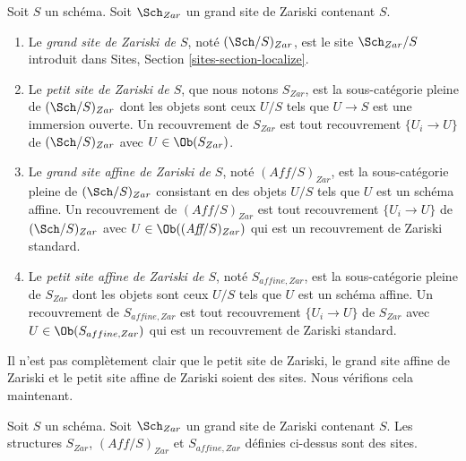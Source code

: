 \begin{definition}
\label{definition-big-small-Zariski}
Soit $S$ un schéma. Soit $\Sch_{Zar}$ un grand site de Zariski contenant $S$.
\begin{enumerate}
\item Le {\it grand site de Zariski de $S$}, noté $(\Sch/S)_{Zar}$, est le site $\Sch_{Zar}/S$ introduit dans Sites, Section \ref{sites-section-localize}.
\item Le {\it petit site de Zariski de $S$}, que nous notons $S_{Zar}$, est la sous-catégorie pleine de $(\Sch/S)_{Zar}$ dont les objets sont ceux $U/S$ tels que $U \to S$ est une immersion ouverte. Un recouvrement de $S_{Zar}$ est tout recouvrement $\{U_i \to U\}$ de $(\Sch/S)_{Zar}$ avec $U \in \Ob(S_{Zar})$.
\item Le {\it grand site affine de Zariski de $S$}, noté $(\textit{Aff}/S)_{Zar}$, est la sous-catégorie pleine de $(\Sch/S)_{Zar}$ consistant en des objets $U/S$ tels que $U$ est un schéma affine. Un recouvrement de $(\textit{Aff}/S)_{Zar}$ est tout recouvrement $\{U_i \to U\}$ de $(\Sch/S)_{Zar}$ avec $U \in \Ob((\textit{Aff}/S)_{Zar})$ qui est un recouvrement de Zariski standard.
\item Le {\it petit site affine de Zariski de $S$}, noté $S_{affine, Zar}$, est la sous-catégorie pleine de $S_{Zar}$ dont les objets sont ceux $U/S$ tels que $U$ est un schéma affine. Un recouvrement de $S_{affine, Zar}$ est tout recouvrement $\{U_i \to U\}$ de $S_{Zar}$ avec $U \in \Ob(S_{affine, Zar})$ qui est un recouvrement de Zariski standard.
\end{enumerate}
\end{definition}

\noindent
Il n’est pas complètement clair que le petit site de Zariski, le grand site affine de Zariski et le petit site affine de Zariski soient des sites. Nous vérifions cela maintenant.

\begin{lemma}
\label{lemma-verify-site-Zariski}
Soit $S$ un schéma. Soit $\Sch_{Zar}$ un grand site de Zariski contenant $S$. Les structures $S_{Zar}$, $(\textit{Aff}/S)_{Zar}$ et $S_{affine, Zar}$ définies ci-dessus sont des sites.
\end{lemma}

